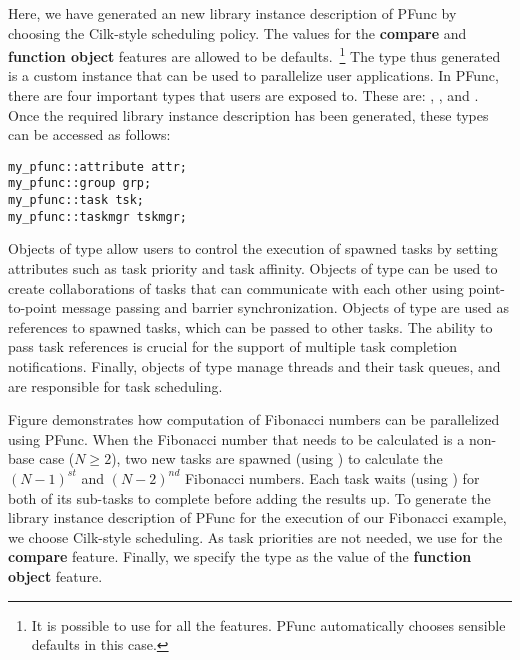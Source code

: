 \documentclass{sig-alternate}
\begin{document}
Here, we have generated an new library instance description of PFunc by
choosing the Cilk-style scheduling policy. The values for the \textbf{compare}
and \textbf{function object} features are allowed to be defaults.~\footnote{It
is possible to use  for all the features.
PFunc automatically chooses sensible defaults in this case.}
The type  thus generated is a custom instance that can be used
to parallelize user applications. In PFunc, there are four important types that
users are exposed to.  These are: ,
,  and .  Once the required library
instance description has been generated, these types can be accessed as
follows:

\begin{lstlisting}
my_pfunc::attribute attr; 
my_pfunc::group grp; 
my_pfunc::task tsk; 
my_pfunc::taskmgr tskmgr; 
\end{lstlisting}

Objects of type  allow users to control the execution of
spawned tasks by setting attributes such as task priority and task affinity. 
Objects of type  can be used to create collaborations of tasks that
can communicate with each other using point-to-point message passing and
barrier synchronization.
Objects of type  are used as references to spawned tasks, which 
can be passed to other tasks. The ability to pass task references is crucial
for the support of multiple task completion notifications.
Finally, objects of type  manage threads and their task
queues, and are responsible for task scheduling. 

Figure demonstrates how computation of Fibonacci numbers
can be parallelized using PFunc. When the Fibonacci number that needs to be
calculated is a non-base case ($N\ge2$), two new tasks are spawned (using
) to calculate the $(N-1)^{st}$ and $(N-2)^{nd}$ Fibonacci numbers.
Each task waits (using ) for both of its sub-tasks to complete
before adding the results up. 
%
To generate the library instance description of PFunc for the execution of our
Fibonacci example, we choose Cilk-style scheduling.  As task priorities are not needed,
we use  for the \textbf{compare} feature.  Finally, we
specify the type  as the value of the \textbf{function object}
feature.
\end{document}
